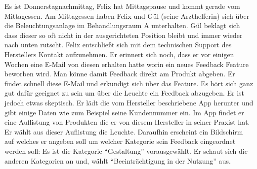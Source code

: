 Es ist Donnerstagnachmittag, Felix hat Mittagspause und kommt gerade vom Mittagessen. Am
Mittagessen haben Felix und Gül (seine Arzthelferin) sich über die Beleuchtungsanlage im
Behandlungsraum A unterhalten. Gül beklagt sich dass dieser so oft nicht in der ausgerichteten
Position bleibt und immer wieder nach unten rutscht.
Felix entschließt sich mit dem technischen Support des Herstellers Kontakt aufzunehmen. Er erinnert
sich noch, dass er vor einigen Wochen eine E-Mail von diesen erhalten hatte worin ein neues
Feedback Feature beworben wird. Man könne damit Feedback direkt am Produkt abgeben. Er findet
schnell diese E-Mail und erkundigt sich über das Feature. Es hört sich ganz gut dafür
geeignet zu sein um über die Leuchte ein Feedback abzugeben. Er ist jedoch etwas skeptisch. Er lädt
die vom Hersteller beschriebene App herunter und gibt einige Daten wie zum Beispiel seine Kundennummer ein.
Im App findet er eine Auflistung von Produkten die er von diesem Hersteller in seiner Praxist hat. 
Er wählt aus dieser Auflistung die Leuchte. Daraufhin erscheint ein Bildschirm auf welches er angeben soll um
welcher Kategorie sein Feedback eingeordnet werden soll: Es ist die Kategorie “Gestaltung” vorausgewählt. 
Er schaut sich die anderen Kategorien an und, wählt “Beeinträchtigung in der Nutzung” aus.


